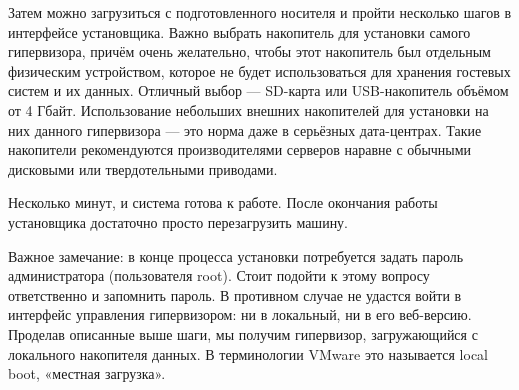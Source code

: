 \documentclass[14pt, a4paper]{article}
\begin{document}
Затем можно загрузиться с подготовленного носителя и пройти несколько шагов в интерфейсе
установщика. Важно выбрать накопитель для установки самого гипервизора, причём очень
желательно, чтобы этот накопитель был отдельным физическим устройством, которое не будет
использоваться для хранения гостевых систем и их данных. Отличный выбор — SD-карта или
USB-накопитель объёмом от 4 Гбайт. Использование небольших внешних накопителей для установки
на них данного гипервизора — это норма даже в серьёзных дата-центрах. Такие накопители
рекомендуются производителями серверов наравне с обычными дисковыми или твердотельными
приводами.

Несколько минут, и система готова к работе. После окончания работы установщика достаточно просто
перезагрузить машину.

\begin{figure}[h]%
    \centering
\end{figure}

Важное замечание: в конце процесса установки потребуется задать пароль администратора
(пользователя root). Стоит подойти к этому вопросу ответственно и запомнить пароль. В противном
случае не удастся войти в интерфейс управления гипервизором: ни в локальный, ни в его веб-версию.
Проделав описанные выше шаги, мы получим гипервизор, загружающийся с локального накопителя
данных. В терминологии VMware это называется local boot, «местная загрузка».
\end{document}
